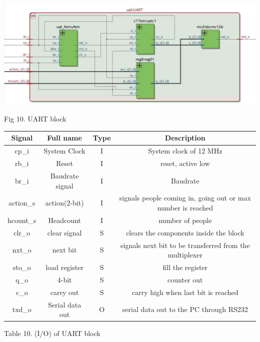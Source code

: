 \documentclass{article}
\begin{document}
\begin{center}

\includegraphics[width=15cm]{uart.JPG}
\end{center}
Fig 10. UART block
\vspace{0.5cm}
 \begin{center}
         \begin{tabular}{|c|c|c|c|}
         \hline
        Signal & Full name & Type & Description \\
        \hline
        \hline
        cp\_i & System Clock & I & System clock of 12 MHz \\ 
        \hline
        rb\_i &   Reset & I & reset, active low \\
        \hline 
        br\_i &   Baudrate signal & I & Baudrate \\
        \hline
       action\_s & action(2-bit) & I & signals people coming in, going out or max number is reached\\
        \hline 
         hcount\_s & Headcount & I &   number of people  \\
         \hline
         clr\_o & clear signal & S & clears the components inside the block \\
        \hline
        nxt\_o & next bit & S &  signals next bit to be transferred from the multiplexer \\
        \hline
        sto\_o & load register & S & fill the register \\
        \hline
         q\_o & 4-bit & S & counter out \\
        \hline
        c\_o & carry out & S &  carry high when last bit is reached \\
        \hline
         txd\_o &  Serial data out &  O & serial data out to the PC through RS232\\
        \hline
        
        \end{tabular}
\end{center}
Table 10. (I/O) of UART block
\vspace{0.5cm}
\end{document}
